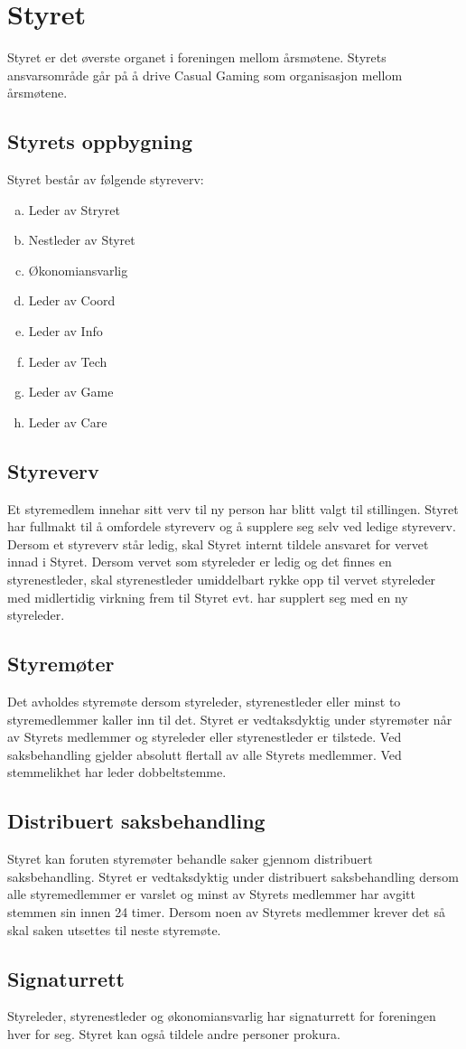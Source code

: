 \chapter{Styret}
Styret er det øverste organet i foreningen mellom årsmøtene. Styrets ansvarsområde går på å drive Casual Gaming som organisasjon mellom årsmøtene.

\section{Styrets oppbygning}
Styret består av følgende styreverv:
\begin{enumerate}[a.]
    \item Leder av Stryret
    \item Nestleder av Styret
    \item Økonomiansvarlig
    \item Leder av Coord
    \item Leder av Info
    \item Leder av Tech
    \item Leder av Game
    \item Leder av Care
\end{enumerate}

\section{Styreverv}
Et styremedlem innehar sitt verv til ny person har blitt valgt til stillingen. Styret har fullmakt til å omfordele styreverv og å supplere seg selv ved ledige styreverv. Dersom et styreverv står ledig, skal Styret internt tildele ansvaret for vervet innad i Styret. Dersom vervet som styreleder er ledig og det finnes en styrenestleder, skal styrenestleder umiddelbart rykke opp til vervet styreleder med midlertidig virkning frem til Styret evt. har supplert seg med en ny styreleder.

\section{Styremøter}
Det avholdes styremøte dersom styreleder, styrenestleder eller minst to styremedlemmer kaller inn til det. Styret er vedtaksdyktig under styremøter når  av Styrets medlemmer og styreleder eller styrenestleder er tilstede. Ved saksbehandling gjelder absolutt flertall av alle Styrets medlemmer. Ved stemmelikhet har leder dobbeltstemme.

\section{Distribuert saksbehandling}
Styret kan foruten styremøter behandle saker gjennom distribuert saksbehandling. Styret er vedtaksdyktig under distribuert saksbehandling dersom alle styremedlemmer er varslet og minst  av Styrets medlemmer har avgitt stemmen sin innen 24 timer. Dersom noen av Styrets medlemmer krever det så skal saken utsettes til neste styremøte.

\section{Signaturrett}
Styreleder, styrenestleder og økonomiansvarlig har signaturrett for foreningen hver for seg. Styret kan også tildele andre personer prokura.
